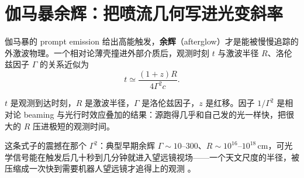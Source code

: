 \section{伽马暴余辉：把喷流几何写进光变斜率}
\label{sec:e20-grb}

伽马暴的 prompt emission 给出高能触发，\textbf{余辉}（afterglow）才是能被慢慢追踪的外激波物理。一个相对论薄壳撞进外部介质后，观测时刻 \(t\) 与激波半径 \(R\)、洛伦兹因子 \(\Gamma\) 的关系近似为
\begin{equation}
  t\simeq \frac{(1+z)R}{4\Gamma^2c}.
  \label{eq:e20-grb-arrival-time}
\end{equation}
\begin{formulaexplain}
\(t\) 是观测到达时刻，\(R\) 是激波半径，\(\Gamma\) 是洛伦兹因子，\(z\) 是红移。因子 \(1/\Gamma^2\) 是相对论 beaming 与光行时效应叠加的结果：源跑得几乎和自己发的光一样快，把很大的 \(R\) 压进极短的观测时间。
\end{formulaexplain}
这条式子的震撼在那个 \(\Gamma^2\)：典型早期余辉 \(\Gamma\sim10\text{--}300\)、\(R\sim10^{16}\text{--}10^{18}\,\mathrm{cm}\)，可光学信号能在触发后几十秒到几分钟就进入望远镜视场——一个天文尺度的半径，被压缩成一次快到需要机器人望远镜才追得上的观测 \citep{1997ApJ...476..232M,1998ApJ...497L..17S,1998Natur.395..670G,1999PhR...314..575P,2004RvMP...76.1143P,2006ARA&A..44..507W}。

